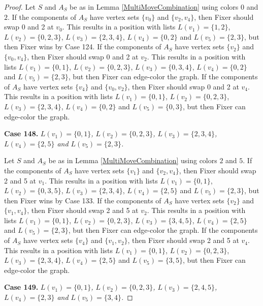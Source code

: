 \documentclass[12pt]{amsart}
\theoremstyle{plain}
\theoremstyle{definition}
\theoremstyle{remark}
\begin{document}
\begin{proof}
Let $S$ and $A_S$ be as in Lemma \ref{MultiMoveCombination} using colors $0$ and $2$. If the components of $A_S$ have vertex sets $\{v_0\}$ and $\{v_2, v_4\}$, then Fixer should swap 0 and 2 at $v_0$. This results in a position with lists $L(v_1) = \{1, 2\}$, $L(v_2) = \{0, 2, 3\}$, $L(v_3) = \{2, 3, 4\}$, $L(v_4) = \{0, 2\}$ and $L(v_5) = \{2, 3\}$, but then Fixer wins by Case 124.
If the components of $A_S$ have vertex sets $\{v_2\}$ and $\{v_0, v_4\}$, then Fixer should swap 0 and 2 at $v_2$. This results in a position with lists $L(v_1) = \{0, 1\}$, $L(v_2) = \{0, 2, 3\}$, $L(v_3) = \{0, 3, 4\}$, $L(v_4) = \{0, 2\}$ and $L(v_5) = \{2, 3\}$, but then Fixer can edge-color the graph.
If the components of $A_S$ have vertex sets $\{v_4\}$ and $\{v_0, v_2\}$, then Fixer should swap 0 and 2 at $v_4$. This results in a position with lists $L(v_1) = \{0, 1\}$, $L(v_2) = \{0, 2, 3\}$, $L(v_3) = \{2, 3, 4\}$, $L(v_4) = \{0, 2\}$ and $L(v_5) = \{0, 3\}$, but then Fixer can edge-color the graph.

\noindent\textbf{Case 148.  }\textit{$L(v_1) = \{0, 1\}$, $L(v_2) = \{0, 2, 3\}$, $L(v_3) = \{2, 3, 4\}$, $L(v_4) = \{2, 5\}$ and $L(v_5) = \{2, 3\}$.}

Let $S$ and $A_S$ be as in Lemma \ref{MultiMoveCombination} using colors $2$ and $5$. If the components of $A_S$ have vertex sets $\{v_1\}$ and $\{v_2, v_4\}$, then Fixer should swap 2 and 5 at $v_1$. This results in a position with lists $L(v_1) = \{0, 1\}$, $L(v_2) = \{0, 3, 5\}$, $L(v_3) = \{2, 3, 4\}$, $L(v_4) = \{2, 5\}$ and $L(v_5) = \{2, 3\}$, but then Fixer wins by Case 133.
If the components of $A_S$ have vertex sets $\{v_2\}$ and $\{v_1, v_4\}$, then Fixer should swap 2 and 5 at $v_2$. This results in a position with lists $L(v_1) = \{0, 1\}$, $L(v_2) = \{0, 2, 3\}$, $L(v_3) = \{3, 4, 5\}$, $L(v_4) = \{2, 5\}$ and $L(v_5) = \{2, 3\}$, but then Fixer can edge-color the graph.
If the components of $A_S$ have vertex sets $\{v_4\}$ and $\{v_1, v_2\}$, then Fixer should swap 2 and 5 at $v_4$. This results in a position with lists $L(v_1) = \{0, 1\}$, $L(v_2) = \{0, 2, 3\}$, $L(v_3) = \{2, 3, 4\}$, $L(v_4) = \{2, 5\}$ and $L(v_5) = \{3, 5\}$, but then Fixer can edge-color the graph.

\noindent\textbf{Case 149.  }\textit{$L(v_1) = \{0, 1\}$, $L(v_2) = \{0, 2, 3\}$, $L(v_3) = \{2, 4, 5\}$, $L(v_4) = \{2, 3\}$ and $L(v_5) = \{3, 4\}$.}


\end{proof}
\end{document}
